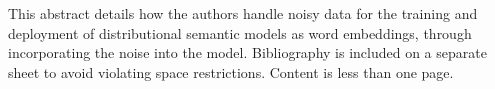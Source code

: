 This abstract details how the authors handle noisy data for the training and deployment of distributional semantic models as word embeddings, through incorporating the noise into the model. Bibliography is included on a separate sheet to avoid violating space restrictions. Content is less than one page.

